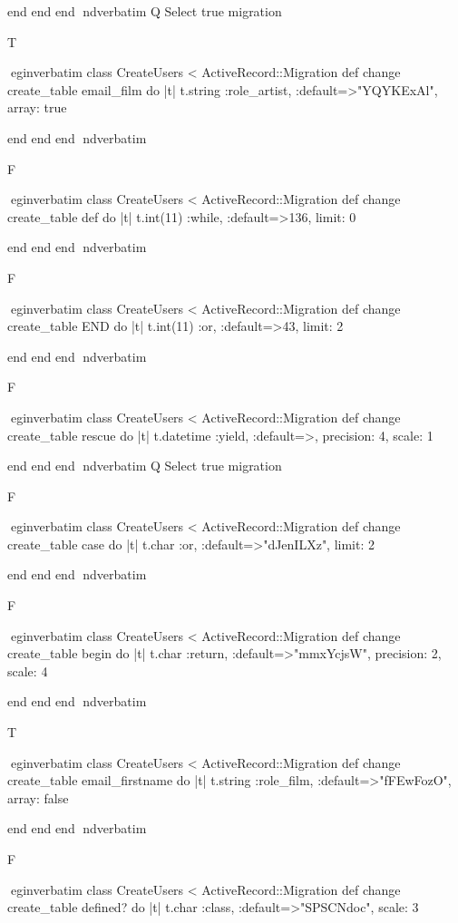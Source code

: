     end 
  end 
end
nd{verbatim}
Q
 Select true migration

T

egin{verbatim}
 class CreateUsers < ActiveRecord::Migration 
  def change 
    create_table email_film do |t| 
      t.string :role_artist, :default=>"YQYKExAl", array: true
    
    end 
  end 
end
nd{verbatim}

F

egin{verbatim}
 class CreateUsers < ActiveRecord::Migration 
  def change 
    create_table def do |t| 
      t.int(11) :while, :default=>136, limit: 0
    
    end 
  end 
end
nd{verbatim}

F

egin{verbatim}
 class CreateUsers < ActiveRecord::Migration 
  def change 
    create_table END do |t| 
      t.int(11) :or, :default=>43, limit: 2
    
    end 
  end 
end
nd{verbatim}

F

egin{verbatim}
 class CreateUsers < ActiveRecord::Migration 
  def change 
    create_table rescue do |t| 
      t.datetime :yield, :default=>, precision: 4, scale: 1
    
    end 
  end 
end
nd{verbatim}
Q
 Select true migration

F

egin{verbatim}
 class CreateUsers < ActiveRecord::Migration 
  def change 
    create_table case do |t| 
      t.char :or, :default=>"dJenILXz", limit: 2
    
    end 
  end 
end
nd{verbatim}

F

egin{verbatim}
 class CreateUsers < ActiveRecord::Migration 
  def change 
    create_table begin do |t| 
      t.char :return, :default=>"mmxYcjsW", precision: 2, scale: 4
    
    end 
  end 
end
nd{verbatim}

T

egin{verbatim}
 class CreateUsers < ActiveRecord::Migration 
  def change 
    create_table email_firstname do |t| 
      t.string :role_film, :default=>"fFEwFozO", array: false
    
    end 
  end 
end
nd{verbatim}

F

egin{verbatim}
 class CreateUsers < ActiveRecord::Migration 
  def change 
    create_table defined? do |t| 
      t.char :class, :default=>"SPSCNdoc", scale: 3
    
